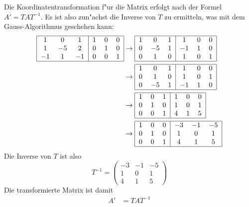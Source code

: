 \begin{loesung}
Die Koordinatentransformation f"ur die Matrix erfolgt nach der Formel $A'=TAT^{-1}$.
Es ist also zun"achst die Inverse von $T$ zu ermitteln, was mit dem Gauss-Algorithmus
geschehen kann:
\begin{align*}
\begin{tabular}{|ccc|ccc|}
\hline
   1 &  0 &  1 &1&0&0\\
   1 &$-5$&  2 &0&1&0\\
 $-1$&  1 &$-1$&0&0&1\\
\hline
\end{tabular}
&\rightarrow
\begin{tabular}{|ccc|ccc|}
\hline
   1 &  0 &  1 &  1 &0&0\\
   0 &$-5$&  1 &$-1$&1&0\\
   0 &  1 &  0 &  1 &0&1\\
\hline
\end{tabular}
\\
&\rightarrow
\begin{tabular}{|ccc|ccc|}
\hline
   1 &  0 &  1 &  1 &0&0\\
   0 &  1 &  0 &  1 &0&1\\
   0 &$-5$&  1 &$-1$&1&0\\
\hline
\end{tabular}
\\
&\rightarrow
\begin{tabular}{|ccc|ccc|}
\hline
   1 &  0 &  1 &  1 &0&0\\
   0 &  1 &  0 &  1 &0&1\\
   0 &  0 &  1 &  4 &1&5\\
\hline
\end{tabular}
\\
&\rightarrow
\begin{tabular}{|ccc|ccc|}
\hline
   1 &  0 &  0 &$-3$&$-1$&$-5$\\
   0 &  1 &  0 &  1 &  0 &  1\\
   0 &  0 &  1 &  4 &  1 &  5\\
\hline
\end{tabular}
\end{align*}
Die Inverse von $T$ ist also
\[
T^{-1}
=
\begin{pmatrix}
  -3& -1& -5\\
   1&  0&  1\\
   4&  1&  5
\end{pmatrix}
\]
Die transformierte Matrix ist damit
\begin{align*}
A'&=TAT^{-1}

\end{align*}
\end{loesung}
